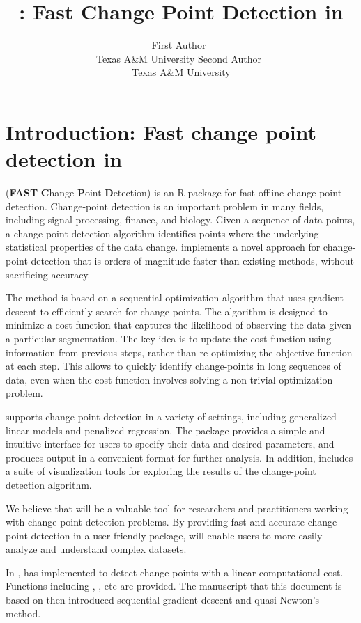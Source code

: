 \documentclass[article]{jss}\usepackage[]{graphicx}\usepackage[]{xcolor}
\author{First Author~\orcidlink{0009-0006-2493-0853}\\Texas A\&M University
   \And Second Author~\orcidlink{0009-0006-2493-0853}\\Texas A\&M University}
\title{\pkg{fastcpd}: Fast Change Point Detection in \proglang{R}}
\newcommand{\fct}[1]{\code{#1()}}
\begin{document}

\section[Introduction: Fast change point detection in R]{Introduction: Fast change point detection in } \label{sec:intro}

 (\textbf{FAST} \textbf{C}hange \textbf{P}oint \textbf{D}etection)
is an R package for fast offline change-point detection.
Change-point detection is an important problem in many fields, including signal
processing, finance, and biology. Given a sequence of data points, a
change-point detection algorithm identifies points where the underlying
statistical properties of the data change.  implements a novel
approach for change-point detection that is orders of magnitude faster than
existing methods, without sacrificing accuracy.

The  method is based on a sequential optimization algorithm that
uses gradient descent to efficiently search for change-points. The algorithm is
designed to minimize a cost function that captures the likelihood of observing
the data given a particular segmentation. The key idea is to update the cost
function using information from previous steps, rather than re-optimizing the
objective function at each step. This allows  to quickly identify
change-points in long sequences of data, even when the cost function involves
solving a non-trivial optimization problem.

 supports change-point detection in a variety of settings,
including generalized linear models and penalized regression. The package
provides a simple and intuitive interface for users to specify their data and
desired parameters, and produces output in a convenient format for further
analysis. In addition,  includes a suite of visualization tools for
exploring the results of the change-point detection algorithm.

We believe that  will be a valuable tool for researchers and
practitioners working with change-point detection problems. By providing fast
and accurate change-point detection in a user-friendly package, 
will enable users to more easily analyze and understand complex datasets.

In  \citep{R}, \cite{killick2014changepoint} has implemented
 to detect change points with a linear computational cost.
Functions including \fct{cpt.mean}, \fct{cpt.var}, \fct{PELT} etc are provided.
The manuscript that this document is based on \citep{zhang2022sequential}
then introduced sequential gradient descent and quasi-Newton's method.
\end{document}
